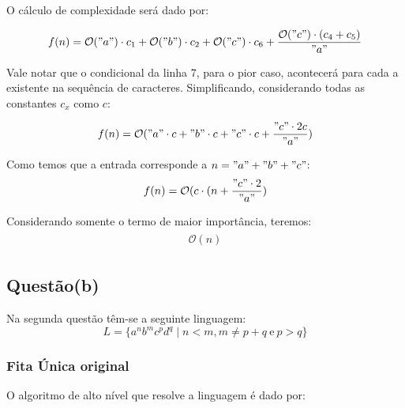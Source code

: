 \documentclass{article}
\begin{document}
O cálculo de complexidade será dado por:

\begin{align}
  \begin{split}
    f(n) = \mathcal{O}("a") \cdot c_1 + \mathcal{O}("b") \cdot c_2 + \mathcal{O}("c") \cdot c_6 + \frac{\mathcal{O}("c") \cdot (c_4 + c_5)}{"a"}  \\
\end{split}
\end{align}

Vale notar que o condicional da linha 7, para o pior caso, acontecerá para cada a existente na sequência de caracteres.
Simplificando, considerando todas as constantes $c_x$ como $c$:

\begin{align}
  \begin{split}
    f(n) = \mathcal{O}("a" \cdot c + "b" \cdot c +"c" \cdot c + \frac{"c" \cdot 2c }{"a"})  \\
\end{split}
\end{align}

Como temos que a entrada corresponde a $n = "a" + "b" + "c"$:
\begin{align}
  \begin{split}
    f(n) = \mathcal{O}(c \cdot (n + \frac{"c" \cdot 2 }{"a"})  \\
\end{split}
\end{align}

Considerando somente o termo de maior importância, teremos:
\begin{align}
  \begin{split}
    \mathcal{O}(n)
\end{split}
\end{align}

\pagebreak

\subsection{Questão(b)}
Na segunda questão têm-se a seguinte linguagem: $$L=\{a^nb^mc^pd^q\mid n<m,m \neq p + q\ \text{e}\ p > q\}$$

\subsubsection{Fita Única original}

O algoritmo de alto nível que resolve a linguagem é dado por:
\end{document}
